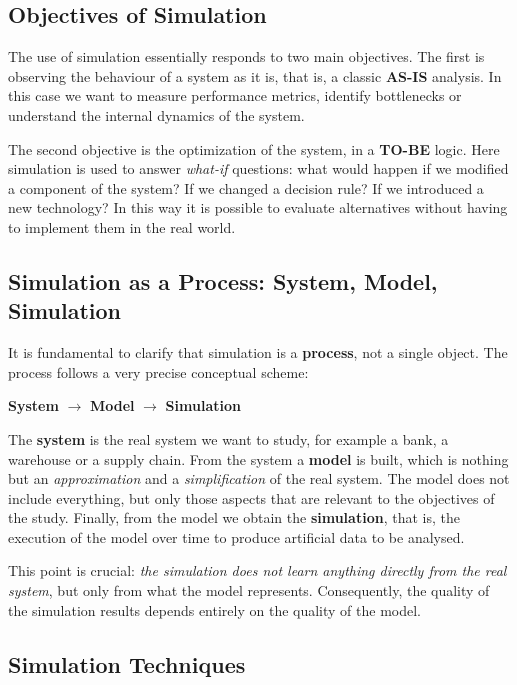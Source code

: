 \subsection{Objectives of Simulation}

The use of simulation essentially responds to two main objectives.
The first is observing the behaviour of a system as it is, that is, a classic \textbf{AS-IS} analysis. In this case we want to measure performance metrics, identify bottlenecks or understand the internal dynamics of the system.

The second objective is the optimization of the system, in a \textbf{TO-BE} logic. Here simulation is used to answer \emph{what-if} questions: what would happen if we modified a component of the system? If we changed a decision rule? If we introduced a new technology? In this way it is possible to evaluate alternatives without having to implement them in the real world.

\subsection{Simulation as a Process: System, Model, Simulation}

It is fundamental to clarify that simulation is a \textbf{process}, not a single object.
The process follows a very precise conceptual scheme:

\begin{center}
\textbf{System} $\longrightarrow$ \textbf{Model} $\longrightarrow$ \textbf{Simulation}
\end{center}

The \textbf{system} is the real system we want to study, for example a bank, a warehouse or a supply chain.
From the system a \textbf{model} is built, which is nothing but an \emph{approximation} and a \emph{simplification} of the real system. The model does not include everything, but only those aspects that are relevant to the objectives of the study.
Finally, from the model we obtain the \textbf{simulation}, that is, the execution of the model over time to produce artificial data to be analysed.

This point is crucial: \emph{the simulation does not learn anything directly from the real system}, but only from what the model represents. Consequently, the quality of the simulation results depends entirely on the quality of the model.

\subsection{Simulation Techniques}

